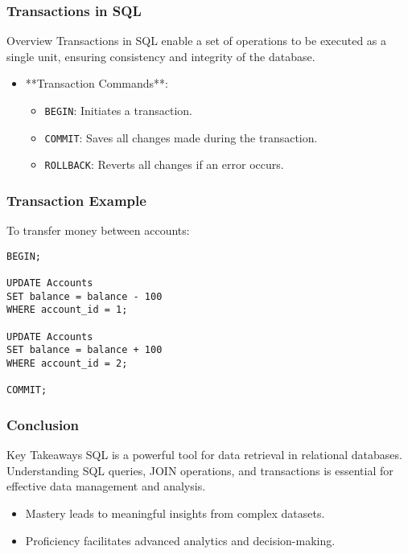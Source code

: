\documentclass[aspectratio=169]{beamer}
\begin{document}
\begin{frame}[fragile]
    \frametitle{Transactions in SQL}
    \begin{block}{Overview}
        Transactions in SQL enable a set of operations to be executed as a single unit, ensuring consistency and integrity of the database.
    \end{block}

    \begin{itemize}
        \item **Transaction Commands**:
        \begin{itemize}
            \item \texttt{BEGIN}: Initiates a transaction.
            \item \texttt{COMMIT}: Saves all changes made during the transaction.
            \item \texttt{ROLLBACK}: Reverts all changes if an error occurs.
        \end{itemize}
    \end{itemize}
\end{frame}

\begin{frame}[fragile]
    \frametitle{Transaction Example}
    To transfer money between accounts:
    \begin{verbatim}
BEGIN;

UPDATE Accounts
SET balance = balance - 100
WHERE account_id = 1;

UPDATE Accounts
SET balance = balance + 100
WHERE account_id = 2;

COMMIT;
    \end{verbatim}
\end{frame}

\begin{frame}[fragile]
    \frametitle{Conclusion}
    \begin{block}{Key Takeaways}
        SQL is a powerful tool for data retrieval in relational databases. Understanding SQL queries, JOIN operations, and transactions is essential for effective data management and analysis.
    \end{block}
    \begin{itemize}
        \item Mastery leads to meaningful insights from complex datasets.
        \item Proficiency facilitates advanced analytics and decision-making.
    \end{itemize}
\end{frame}
\end{document}
